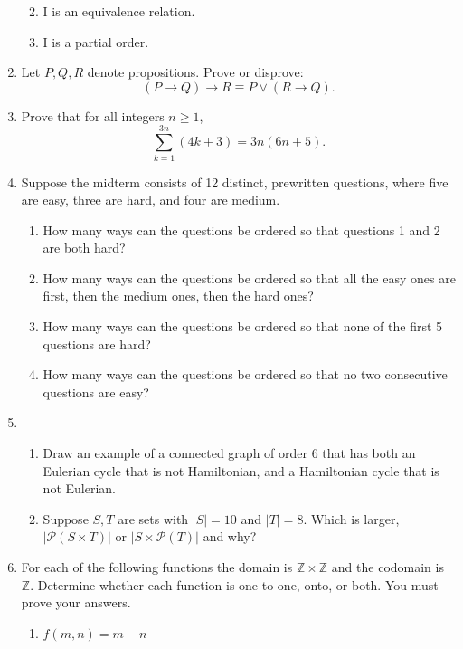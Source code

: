 \documentclass[12pt,letterpaper]{article}
\begin{document}
\begin{enumerate}
\begin{enumerate}
\vspace{6pc}
\item I is an equivalence relation.

\vspace{6pc}
\item I is a partial order.
\end{enumerate}

\newpage
\item Let $P,Q,R$ denote propositions.  Prove or disprove: 
\[(P\to Q)\to R\equiv P\vee(R\to Q).\]

\newpage
\item Prove that for all integers $n\geq 1$,
\[\sum_{k=1}^{3n}(4k+3)=3n(6n+5).\]

\newpage
\item Suppose the midterm consists of 12 distinct, prewritten questions, where five are easy, three are hard, and four are medium.
\begin{enumerate}
\item How many ways can the questions be ordered so that questions 1 and 2 are both hard?

\vspace{9pc}
\item How many ways can the questions be ordered so that all the easy ones are first, then the medium ones, then the hard ones?

\vspace{9pc} 
\item How many ways can the questions be ordered so that none of the first 5 questions are hard?

\vspace{9pc}
\item How many ways can the questions be ordered so that no two consecutive questions are easy?
  
\end{enumerate}

\newpage
\item \begin{enumerate}\item Draw an example of a connected graph of order 6 that has both an Eulerian cycle that is not Hamiltonian, and a Hamiltonian cycle that is not Eulerian. 

\vspace{23pc}
\item Suppose $S,T$ are sets with $|S|=10$ and $|T|=8$.  Which is larger, $|\mathscr P(S\times T)|$ or $|S\times\mathscr P(T)|$ and why?
\end{enumerate}
\newpage
\item For each of the following functions the domain is $\mathbb Z\times\mathbb Z$ and the codomain is $\mathbb Z$.  Determine whether each function is one-to-one, onto, or both.  You must prove your answers.  
\begin{enumerate}
\item $f(m,n)=m-n$


\end{enumerate}
\end{enumerate}
\end{document}
